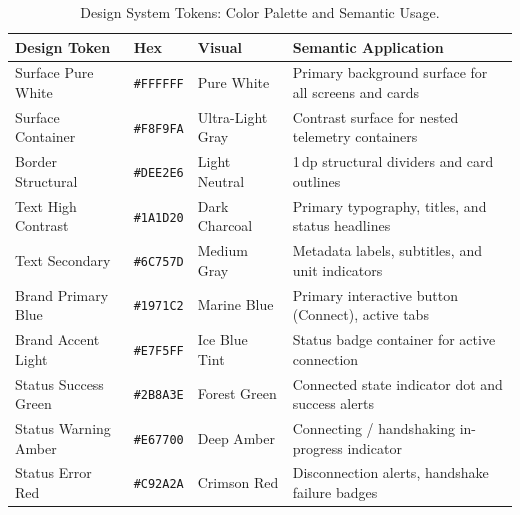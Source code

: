 \begin{table}[htbp]
  \centering
  \scriptsize
  \setlength{\tabcolsep}{3pt}
  \caption{Design System Tokens: Color Palette and Semantic Usage.}
  \label{tab:design_tokens_color}
  \begin{tabularx}{\linewidth}{@{}p{2.8cm}p{1.4cm}p{1.8cm}Y@{}}
    \toprule
    \textbf{Design Token} & \textbf{Hex} & \textbf{Visual} & \textbf{Semantic Application} \\
    \midrule
    Surface Pure White & \texttt{\#FFFFFF} & Pure White & Primary background surface for all screens and cards \\
    Surface Container & \texttt{\#F8F9FA} & Ultra-Light Gray & Contrast surface for nested telemetry containers \\
    Border Structural & \texttt{\#DEE2E6} & Light Neutral & 1\,dp structural dividers and card outlines \\
    Text High Contrast & \texttt{\#1A1D20} & Dark Charcoal & Primary typography, titles, and status headlines \\
    Text Secondary & \texttt{\#6C757D} & Medium Gray & Metadata labels, subtitles, and unit indicators \\
    Brand Primary Blue & \texttt{\#1971C2} & Marine Blue & Primary interactive button (Connect), active tabs \\
    Brand Accent Light & \texttt{\#E7F5FF} & Ice Blue Tint & Status badge container for active connection \\
    Status Success Green & \texttt{\#2B8A3E} & Forest Green & Connected state indicator dot and success alerts \\
    Status Warning Amber & \texttt{\#E67700} & Deep Amber & Connecting / handshaking in-progress indicator \\
    Status Error Red & \texttt{\#C92A2A} & Crimson Red & Disconnection alerts, handshake failure badges \\
    \bottomrule
  \end{tabularx}
\end{table}

